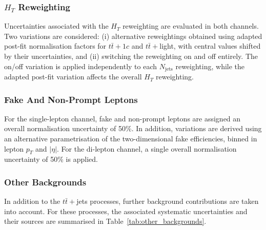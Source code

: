 \subsubsection{$H_{T}$ Reweighting}
Uncertainties associated with the $H_{T}$ reweighting are evaluated in both channels.  Two variations are considered: (i) alternative reweightings obtained using adapted post-fit normalisation factors for $t\bar{t}+1c$ and $t\bar{t}+$light, with central values shifted by their uncertainties, and (ii) switching the reweighting on and off entirely.  The on/off variation is applied independently to each $N_{\text{jets}}$ reweighting, while the adapted post-fit variation affects the overall $H_{T}$ reweighting.  

\subsubsection{Fake And Non-Prompt Leptons}
For the single-lepton channel, fake and non-prompt leptons are assigned an overall normalisation uncertainty of 50\%.  In addition, variations are derived using an alternative parametrisation of the two-dimensional fake efficiencies, binned in lepton $p_{T}$ and $|\eta|$.  For the di-lepton channel, a single overall normalisation uncertainty of 50\% is applied.  
\subsubsection{Other Backgrounds}
In addition to the $t\bar{t}+$jets processes, further background contributions are taken into account.  
For these processes, the associated systematic uncertainties and their sources are summarised in Table~\ref{tab:other_backgrounds}. 

